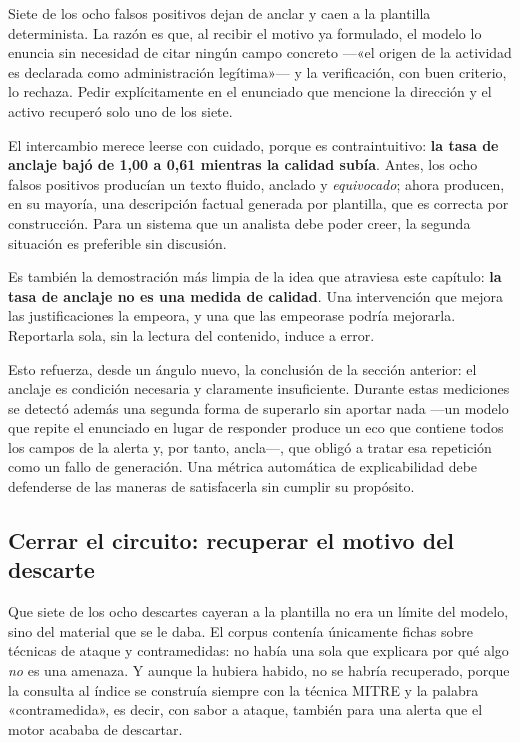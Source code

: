 Siete de los ocho falsos positivos dejan de anclar y caen a la plantilla determinista. La razón es
que, al recibir el motivo ya formulado, el modelo lo enuncia sin necesidad de citar ningún campo
concreto ---«el origen de la actividad es declarada como administración legítima»--- y la
verificación, con buen criterio, lo rechaza. Pedir explícitamente en el enunciado que mencione la
dirección y el activo recuperó solo uno de los siete.

El intercambio merece leerse con cuidado, porque es contraintuitivo: \textbf{la tasa de anclaje
bajó de 1,00 a 0,61 mientras la calidad subía}. Antes, los ocho falsos positivos producían un texto
fluido, anclado y \emph{equivocado}; ahora producen, en su mayoría, una descripción factual generada
por plantilla, que es correcta por construcción. Para un sistema que un analista debe poder creer,
la segunda situación es preferible sin discusión.

Es también la demostración más limpia de la idea que atraviesa este capítulo: \textbf{la tasa de
anclaje no es una medida de calidad}. Una intervención que mejora las justificaciones la empeora, y
una que las empeorase podría mejorarla. Reportarla sola, sin la lectura del contenido, induce a
error.

Esto refuerza, desde un ángulo nuevo, la conclusión de la sección anterior: el anclaje es condición
necesaria y claramente insuficiente. Durante estas mediciones se detectó además una segunda forma
de superarlo sin aportar nada ---un modelo que repite el enunciado en lugar de responder produce un
eco que contiene todos los campos de la alerta y, por tanto, ancla---, que obligó a tratar esa
repetición como un fallo de generación. Una métrica automática de explicabilidad debe defenderse de
las maneras de satisfacerla sin cumplir su propósito.

\subsection{Cerrar el circuito: recuperar el motivo del descarte}
\label{sec:cerrar-circuito}

Que siete de los ocho descartes cayeran a la plantilla no era un límite del modelo, sino del
material que se le daba. El corpus contenía únicamente fichas sobre técnicas de ataque y
contramedidas: no había una sola que explicara por qué algo \emph{no} es una amenaza. Y aunque la
hubiera habido, no se habría recuperado, porque la consulta al índice se construía siempre con la
técnica MITRE y la palabra «contramedida», es decir, con sabor a ataque, también para una alerta
que el motor acababa de descartar.

